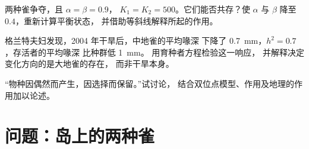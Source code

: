\begin{exercise}[$\star\star\star$]\label{exo:b2:speciation:10}
两种雀争夺，且 $\alpha = \beta = 0.9$，
$K_1 = K_2 = 500$。它们能否共存？使
$\alpha$ 与 $\beta$ 降至 $0.4$，重新计算平衡状态，
并借助等斜线解释所起的作用。
\end{exercise}

\begin{exercise}[$\star\star\star$]\label{exo:b2:speciation:11}
格兰特夫妇发现，2004 年干旱后，中地雀的平均喙深
下降了 \qty{0.7}{mm}，$h^{2} = 0.7$，存活者的平均喙深
比种群低 \qty{1}{mm}。
用育种者方程检验这一响应，
并解释决定变化方向的是大地雀的存在，
而非干旱本身。
\end{exercise}

\begin{exercise}[$\star\star\star$]\label{exo:b2:speciation:12}
“物种因偶然而产生，因选择而保留。”试讨论，
结合双位点模型、作用及地理的作用加以论述。
\end{exercise}

\section{问题：岛上的两种雀}

